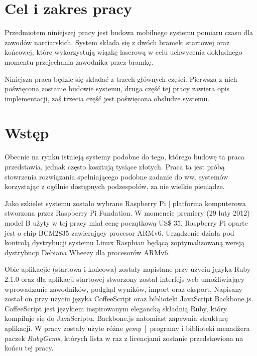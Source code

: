 \documentclass[11pt,a4paper, twoside]{article}
\begin{document}
\sloppy

\tableofcontents

\newpage
\cleardoublepage
\section{Cel i zakres pracy}
Przedmiotem niniejszej pracy jest budowa mobilnego systemu pomiaru czasu dla zawodów narciarskich. System składa się z dwóch bramek: startowej oraz końcowej, które wykorzystują wiązkę laserową w celu uchwycenia dokładnego momentu przejechania zawodnika przez bramkę. 

Niniejsza praca będzie się składać z trzech głównych części. Pierwsza z nich poświęcona zostanie budowie systemu, druga część tej pracy zawiera opis implementacji, zaś trzecia część jest poświęcona obsłudze systemu.

\section{Wstęp}
Obecnie na rynku istnieją systemy podobne do tego, którego budowę ta praca przedstawia, jednak często kosztują tysiące złotych. Praca ta jest próbą stowrzenia rozwiązania spełniającego podobne zadanie do ww. systemów korzystając z ogólnie dostępnych podzespołów, za nie wielkie pieniądze.

Jako szkielet systemu zostało wybrane Raspberry Pi | platforma komputerowa stworzona przez Raspberry Pi Fundation. W momencie premiery (29 luty 2012) model B użyty w tej pracy miał cenę początkową US\$ 35. Raspberry Pi oparte jest o chip BCM2835 zawierający procesor ARMv6. Urządzenie działa pod kontrolą dystrybucji systemu Linux Raspbian będącą zoptymalizowaną wersją dystrybucji Debiana Wheezy dla procesorów ARMv6.

Obie aplikacjie (startowa i końcowa) zostały napistane przy użyciu języka Ruby 2.1.0 oraz dla aplikacji startowej stworzony został interfejs web umożliwiający wprowadzanie zawodników, podgląd wyników, import oraz eksport. Napisany został on przy użyciu języka CoffeeScript oraz biblioteki JavaScript Backbone.js. 
CoffeeScript jest językiem inspirowanym elegancką składnią Ruby, który kompiluje się do JavaScriptu. Backbone.js natomiast zapewnia strukturę aplikacji.
\newline
\newline
\noindent
W pracy zostały użyte różne \emph{gemy}~|~programy i biblioteki menadżera paczek \emph{RubyGems}, których lista w raz z licencjami zostanie przedstawiona na końcu tej pracy.
\newline
\end{document}
